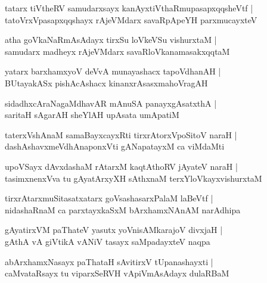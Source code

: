 \documentclass[twoside,12pt,openright]{book}
\newcounter{shloka}[chapter]
\begin{document}
\begin{shloka}
tatarx tiVtheRV samudarxsayx kanAyxtiVthaRmupasapxqqsheVtf |\\
tatoVrxVpasapxqqshayx rAjeVMdarx savaRpApeYH parxmucayxteV 
\end{shloka}

\begin{shloka}
atha goVkaNaRmAsAdayx tirxSu loVkeVSu vishurxtaM |\\
samudarx madheyx rAjeVMdarx savaRloVkanamasakxqqtaM 
\end{shloka}

\begin{shloka}
yatarx barxhamxyoV deVvA munayashacx tapoVdhanAH |\\
BUtayakASx pishAcAshacx kinanxrAsasxmahoVragAH 
\end{shloka}

\begin{shloka}
sidadhxcAraNagaMdhavAR mAnuSA panayxgAsatxthA |\\
saritaH sAgarAH sheYlAH upAsata umApatiM 
\end{shloka}

\begin{shloka}
taterxVshAnaM samaBayxcayxRti tirxrAtorxVpoSitoV naraH |\\
dashAshavxmeVdhAnaponxVti gANapatayxM ca viMdaMti 
\end{shloka}

\begin{shloka}
upoVSayx dAvxdashaM rAtarxM kaqtAthoRV jAyateV naraH |\\
tasimxnenxVva tu gAyatArxyXH sAthxnaM terxYloVkayxvishurxtaM 
\end{shloka}

\begin{shloka}
tirxrAtarxmuSitasatxatarx goVsashasarxPalaM laBeVtf |\\
nidashaRnaM ca parxtayxkaSxM bArxhamxNAnAM narAdhipa 
\end{shloka}

\begin{shloka}
gAyatirxVM paThateV yasutx yoVnisAMkarajoV divxjaH |\\
gAthA vA giVtikA vANiV tasayx saMpadayxteV naqpa 
\end{shloka}

\begin{shloka}
abArxhamxNasayx paThataH sAvitirxV tUpanashayxti |\\
caMvataRsayx tu viparxSeRVH vApiVmAsAdayx dulaRBaM 
\end{shloka}
\end{document}

